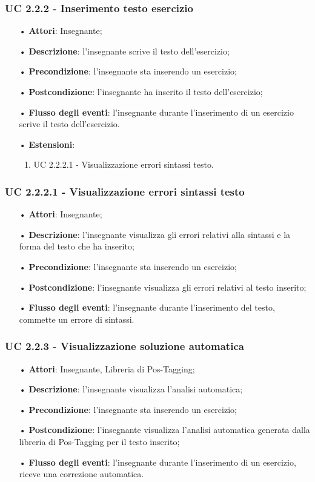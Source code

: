 \subsubsection{UC 2.2.2 - Inserimento testo esercizio}
\begin{itemize}
	\item[•] \textbf{Attori}: Insegnante;
	\item[•] \textbf{Descrizione}: l'insegnante scrive il testo dell'esercizio;
	\item[•] \textbf{Precondizione}: l'insegnante sta inserendo un esercizio;
	\item[•] \textbf{Postcondizione}: l'insegnante ha inserito il testo dell'esercizio;
	\item[•] \textbf{Flusso degli eventi}: l'insegnante durante l'inserimento di un esercizio scrive il testo dell'esercizio.
		\item[•] \textbf{Estensioni}:	
	\begin{enumerate}
		\item UC 2.2.2.1 - Visualizzazione errori sintassi testo.
	\end{enumerate}
			
\end{itemize}

\subsubsection{UC 2.2.2.1 - Visualizzazione errori sintassi testo}
\begin{itemize}
	\item[•] \textbf{Attori}: Insegnante;
	\item[•] \textbf{Descrizione}: l'insegnante visualizza gli errori relativi alla sintassi e la forma del testo che ha inserito;
	\item[•] \textbf{Precondizione}: l'insegnante sta inserendo un esercizio;
	\item[•] \textbf{Postcondizione}: l'insegnante visualizza gli errori relativi al testo inserito;
	\item[•] \textbf{Flusso degli eventi}: l'insegnante durante l'inserimento del testo, commette un errore di sintassi.
\end{itemize}

\subsubsection{UC 2.2.3 - Visualizzazione soluzione automatica} 
\begin{itemize}
	\item[•] \textbf{Attori}: Insegnante, Libreria di Pos-Tagging;
	\item[•] \textbf{Descrizione}: l'insegnante visualizza l'analisi automatica;
	\item[•] \textbf{Precondizione}: l'insegnante sta inserendo un esercizio;
	\item[•] \textbf{Postcondizione}: l'insegnante visualizza l'analisi automatica generata dalla libreria di Pos-Tagging per il testo inserito;
	\item[•] \textbf{Flusso degli eventi}: l'insegnante durante l'inserimento di un esercizio, riceve una correzione automatica.
\end{itemize}


